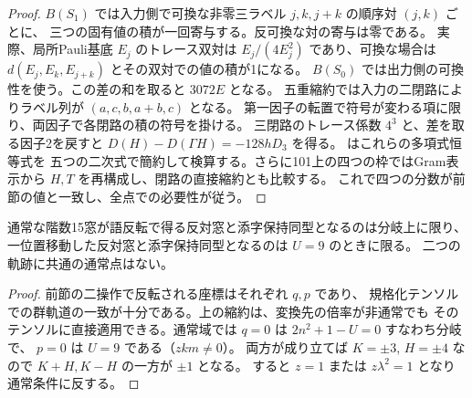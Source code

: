 \begin{proof}
$B(S_1)$ では入力側で可換な非零三ラベル $j,k,j+k$ の順序対 $(j,k)$ ごとに、
三つの固有値の積が一回寄与する。反可換な対の寄与は零である。
実際、局所Pauli基底 $E_j$ のトレース双対は $E_j/(4E_j^2)$ であり、可換な場合は
$d(E_j,E_k,E_{j+k})$ とその双対での値の積が1になる。
$B(S_0)$ では出力側の可換性を使う。この差の和を取ると $3072E$ となる。
五重縮約では入力の二閉路によりラベル列が $(a,c,b,a+b,c)$ となる。
第一因子の転置で符号が変わる項に限り、両因子で各閉路の積の符号を掛ける。
三閉路のトレース係数 $4^3$ と、差を取る因子2を戻すと
$D(H)-D(\Gamma H)=-128hD_3$ を得る。
 はこれらの多項式恒等式を
五つの二次式で簡約して検算する。さらに101上の四つの枠ではGram表示から
$H,T$ を再構成し、閉路の直接縮約とも比較する。
これで四つの分数が前節の値と一致し、全点での必要性が従う。
\end{proof}

\begin{corollary}
通常な階数15窓が語反転で得る反対窓と添字保持同型となるのは分岐上に限り、
一位置移動した反対窓と添字保持同型となるのは $U=9$ のときに限る。
二つの軌跡に共通の通常点はない。
\end{corollary}
\begin{proof}
前節の二操作で反転される座標はそれぞれ $q,p$ であり、
規格化テンソルでの群軌道の一致が十分である。上の縮約は、変換先の倍率が非通常でも
そのテンソルに直接適用できる。通常域では $q=0$ は $2n^2+1-U=0$ すなわち分岐で、
$p=0$ は $U=9$ である（$zkm\ne0$）。
両方が成り立てば $K=\pm3$, $H=\pm4$ なので $K+H,K-H$ の一方が $\pm1$ となる。
すると $z=1$ または $z\lambda^2=1$ となり通常条件に反する。
\end{proof}
